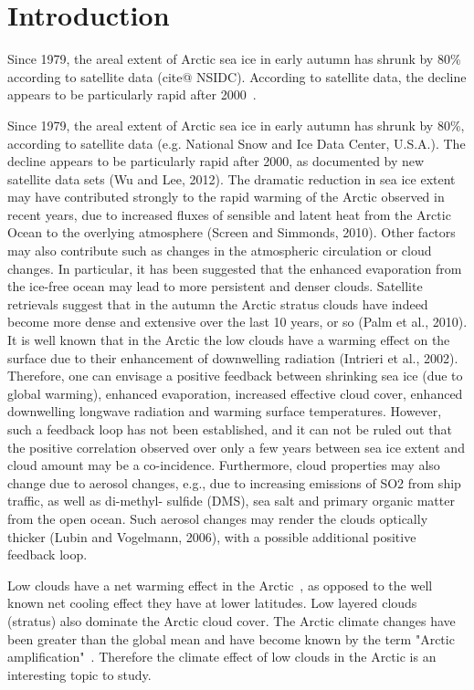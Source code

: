 \chapter{Introduction}
\label{chap:introduction}
Since 1979, the areal extent of Arctic sea ice in early autumn has shrunk by 80\% according to satellite data (cite@ NSIDC). According to satellite data, the decline appears to be particularly rapid after 2000~\citep{Wu2012}. 




Since 1979, the areal extent of Arctic sea ice in early autumn has shrunk by 80\%, according to satellite data (e.g. National Snow and Ice Data Center, U.S.A.). The decline appears to be particularly rapid after 2000, as documented by new satellite data sets (Wu and Lee, 2012). The dramatic reduction in sea ice extent may have contributed strongly to the rapid warming of the Arctic observed in recent years, due to increased fluxes of sensible and latent heat from the Arctic Ocean to the overlying atmosphere (Screen and Simmonds, 2010). Other factors may also contribute such as changes in the atmospheric circulation or cloud changes. In particular, it has been suggested that the enhanced evaporation from the ice-free ocean may lead to more persistent and denser clouds. Satellite retrievals suggest that in the autumn the Arctic stratus clouds have indeed become more dense and extensive over the last 10 years, or so (Palm et al., 2010). It is well known that in the Arctic the low clouds have a warming effect on the surface due to their enhancement of downwelling radiation (Intrieri et al., 2002). Therefore, one can envisage a positive feedback between shrinking sea ice (due to global warming), enhanced evaporation, increased effective cloud cover, enhanced downwelling longwave radiation and warming surface temperatures. However, such a feedback loop has not been established, and it can not be ruled out that the positive correlation observed over only a few years between sea ice extent and cloud amount may be a co-incidence. Furthermore, cloud properties may also change due to aerosol changes, e.g., due to increasing emissions of SO2 from ship traffic, as well as di-methyl- sulfide (DMS), sea salt and primary organic matter from the open ocean. Such aerosol changes may render the clouds optically thicker (Lubin and Vogelmann, 2006), with a possible additional positive feedback loop.



Low clouds have a net warming effect in the Arctic~\citep{Intrieri2002a}, as opposed to the well known net cooling effect they have at lower latitudes. Low layered clouds (stratus) also dominate the Arctic cloud cover. The Arctic climate changes have been greater than the global mean and have become known by the term "Arctic amplification"~\citep{Graversen2008}. Therefore the climate effect of low clouds in the Arctic is an interesting topic to study.

